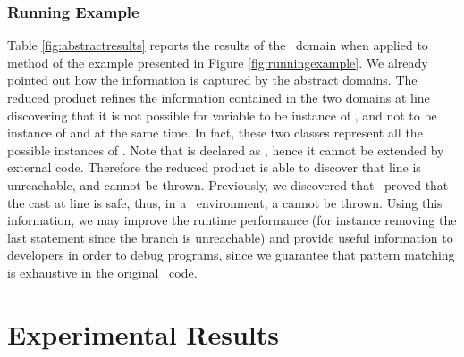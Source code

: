 \documentclass{llncs}
\begin{document}
\subsubsection{Running Example}
Table \ref{fig:abstractresults} reports the results of the \notandtypesdomain\ domain when applied to method  of the example presented in Figure \ref{fig:runningexample}. We already pointed out how the information is captured by the abstract domains. The reduced product refines the information contained in the two domains at line  discovering that it is not possible for variable  to be instance of , and not to be instance of  and  at the same time. In fact, these two classes represent all the possible instances of . Note that  is declared as , hence it cannot be extended by external code. Therefore the reduced product is able to discover that line  is unreachable, and  cannot be thrown. Previously, we discovered that \dynamictype\ proved that the cast at line  is safe, thus, in a \Java\ environment, a  cannot be thrown. Using this information, we may improve the runtime performance (for instance removing the last  statement since the  branch is unreachable) and provide useful information to developers in order to debug programs, since we guarantee that pattern matching is exhaustive in the original \Scala\ code.


\section{Experimental Results}
\label{sect:experimentalresults}
\end{document}
